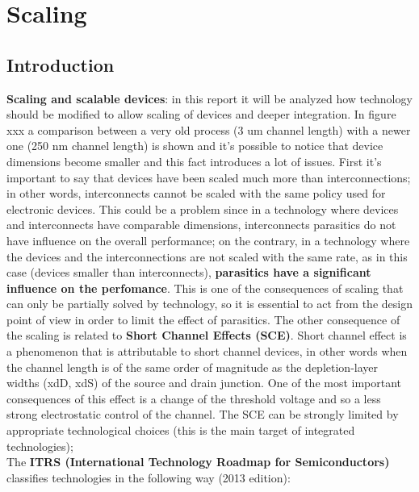 \documentclass[a4paper, 12pt, twoside, openright]{report}
\begin{document}
\tableofcontents

\chapter{Scaling}

\section{Introduction}

\textbf{Scaling and scalable devices}: in this report it will be analyzed how technology should be modified to allow scaling of devices and deeper integration.
In figure xxx a comparison between a very old process (3 um channel length) with a newer one (250 nm channel length) is shown and it's possible to notice that device dimensions become smaller and this fact introduces a lot of issues.
First it's important to say that devices have been scaled much more than interconnections; in other words, interconnects cannot be scaled with the same policy used for electronic devices. This could be a problem since in a technology where devices and interconnects have comparable dimensions, interconnects parasitics do not have influence on the overall performance; on the contrary, in a technology where the devices and the interconnections are not scaled with the same rate, as in this case (devices smaller than interconnects), \textbf{parasitics have a significant influence on the perfomance}. This is one of the consequences of scaling that can only be partially solved by technology, so it is essential to act from the design point of view in order to limit the effect of parasitics. The other consequence of the scaling is related to \textbf{Short Channel Effects (SCE)}. Short channel effect is a phenomenon that is attributable to short channel devices, in other words when the channel length is of the same order of magnitude as the depletion-layer widths (xdD, xdS) of the source and drain junction. One of the most important consequences of this effect is a change of the threshold voltage and so a less strong electrostatic control of the channel. The SCE can be strongly limited by appropriate technological choices (this is the main target of integrated technologies); \\

The \textbf{ITRS (International Technology Roadmap for Semiconductors)} classifies technologies in the following way (2013 edition):
\end{document}
